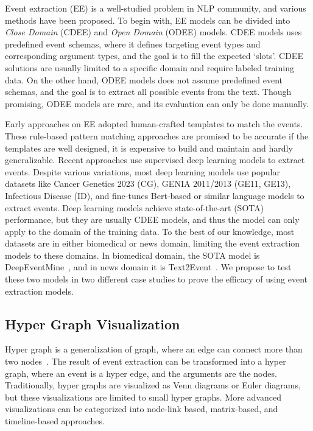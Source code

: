 Event extraction (EE) is a well-studied problem in NLP community, and various methods have been proposed.
To begin with, EE models can be divided into \textit{Close Domain} (CDEE) and \textit{Open Domain} (ODEE) models.
CDEE models uses predefined event schemas, where it defines targeting event types and corresponding argument types, and the goal is to fill the expected `slots'.
CDEE solutions are usually limited to a specific domain and require labeled training data.
On the other hand, ODEE models does not assume predefined event schemas, and the goal is to extract all possible events from the text.
Though promising, ODEE models are rare, and its evaluation can only be done manually.

Early approaches on EE adopted human-crafted templates to match the events.
These rule-based pattern matching approaches are promised to be accurate if the templates are well designed, it is expensive to build and maintain and hardly generalizable.
Recent approaches use supervised deep learning models to extract events.
Despite various variations, most deep learning models use popular datasets like Cancer Genetics 2023 (CG), GENIA 2011/2013 (GE11, GE13), Infectious Disease (ID),
and fine-tunes Bert-based or similar language models to extract events.
Deep learning models achieve state-of-the-art (SOTA) performance, but they are usually CDEE models, and thus the model can only apply to the domain of the training data.
To the best of our knowledge, most datasets are in either biomedical or news domain, limiting the event extraction models to these domains.
In biomedical domain, the SOTA model is DeepEventMine~\cite{trieu2020deepeventmine}, and in news domain it is Text2Event~\cite{lu2021text2event}.
We propose to test these two models in two different case studies to prove the efficacy of using event extraction models.

\subsection{Hyper Graph Visualization}
Hyper graph is a generalization of graph, where an edge can connect more than two nodes~\cite{fischer2021hypergraphsurvey}.
The result of event extraction can be transformed into a hyper graph, where an event is a hyper edge, and the arguments are the nodes.
Traditionally, hyper graphs are visualized as Venn diagrams or Euler diagrams, but these visualizations are limited to small hyper graphs.
More advanced visualizations can be categorized into node-link based, matrix-based, and timeline-based approaches.

